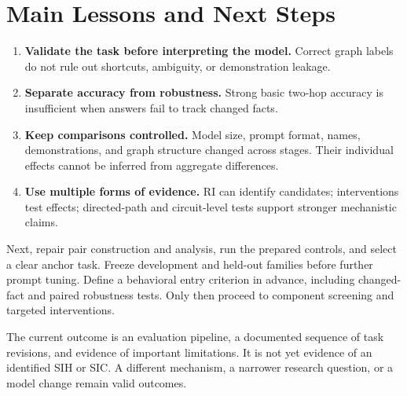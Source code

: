 \documentclass[11pt,a4paper]{article}
\begin{document}
\section{Main Lessons and Next Steps}
\begin{enumerate}
\item \textbf{Validate the task before interpreting the model.} Correct graph labels do not rule out shortcuts, ambiguity, or demonstration leakage.
\item \textbf{Separate accuracy from robustness.} Strong basic two-hop accuracy is insufficient when answers fail to track changed facts.
\item \textbf{Keep comparisons controlled.} Model size, prompt format, names, demonstrations, and graph structure changed across stages. Their individual effects cannot be inferred from aggregate differences.
\item \textbf{Use multiple forms of evidence.} RI can identify candidates; interventions test effects; directed-path and circuit-level tests support stronger mechanistic claims.
\end{enumerate}

Next, repair pair construction and analysis, run the prepared controls, and select a clear anchor task. Freeze development and held-out families before further prompt tuning. Define a behavioral entry criterion in advance, including changed-fact and paired robustness tests. Only then proceed to component screening and targeted interventions.

The current outcome is an evaluation pipeline, a documented sequence of task revisions, and evidence of important limitations. It is not yet evidence of an identified SIH or SIC. A different mechanism, a narrower research question, or a model change remain valid outcomes.

\appendix
\end{document}
